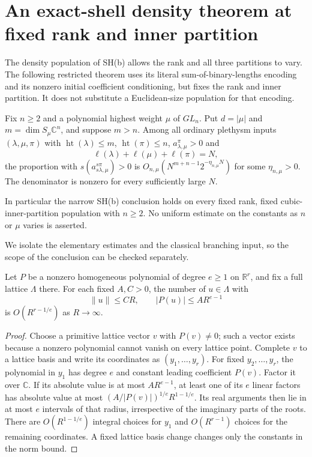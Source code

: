 \section{An exact-shell density theorem at fixed rank and inner partition}
\label{sec:fixed-rank-density}

The density population of SH(b) allows the rank and all three
partitions to vary.  The following restricted theorem uses its
literal sum-of-binary-lengths encoding and its nonzero initial
coefficient conditioning, but fixes the rank and inner partition.
It does not substitute a Euclidean-size population for that encoding.

\begin{theorem}
Fix $n\ge2$ and a polynomial highest weight $\mu$ of $GL_n$.
Put $d=|\mu|$ and $m=\dim S_\mu\mathbb C^n$, and suppose
$m>n$.  Among all ordinary plethysm inputs $(\lambda,\mu,\pi)$
with $\operatorname{ht}(\lambda)\le m$, $\operatorname{ht}(\pi)\le n$,
$a_{\lambda,\mu}^{\pi}>0$ and
\[
              \ell(\lambda)+\ell(\mu)+\ell(\pi)=N,
\]
the proportion with $s(a_{s\lambda,\mu}^{s\pi})>0$ is
$O_{n,\mu}(N^{m+n-1}2^{-\eta_{n,\mu}N})$ for some
$\eta_{n,\mu}>0$.  The denominator is nonzero for every
sufficiently large $N$.

In particular the narrow SH(b) conclusion holds on every fixed
rank, fixed cubic-inner-partition population with $n\ge2$.
No uniform estimate on the constants as $n$ or $\mu$ varies is
asserted.
\end{theorem}

We isolate the elementary estimates and the classical branching
input, so the scope of the conclusion can be checked separately.

\begin{lemma}
Let $P$ be a nonzero homogeneous polynomial of degree $e\ge1$
on $\mathbb R^r$, and fix a full lattice $\Lambda$ there.
For each fixed $A,C>0$, the number of $u\in\Lambda$ with
\[
       \|u\|\le CR,\qquad |P(u)|\le AR^{e-1}
\]
is $O(R^{r-1/e})$ as $R\to\infty$.
\end{lemma}
\begin{proof}
Choose a primitive lattice vector $v$ with $P(v)\ne0$;
such a vector exists because a nonzero polynomial cannot vanish
on every lattice point.  Complete $v$ to a lattice basis and
write its coordinates as $(y_1,\ldots,y_r)$.  For fixed
$y_2,\ldots,y_r$, the polynomial in $y_1$ has degree $e$
and constant leading coefficient $P(v)$.  Factor it over
$\mathbb C$.  If its absolute value is at most $AR^{e-1}$,
at least one of its $e$ linear factors has absolute value at
most $(A/|P(v)|)^{1/e}R^{1-1/e}$.  Its real arguments then
lie in at most $e$ intervals of that radius, irrespective
of the imaginary parts of the roots.  There are
$O(R^{1-1/e})$ integral choices for $y_1$ and $O(R^{r-1})$
choices for the remaining coordinates.  A fixed lattice basis
change changes only the constants in the norm bound.
\end{proof}

